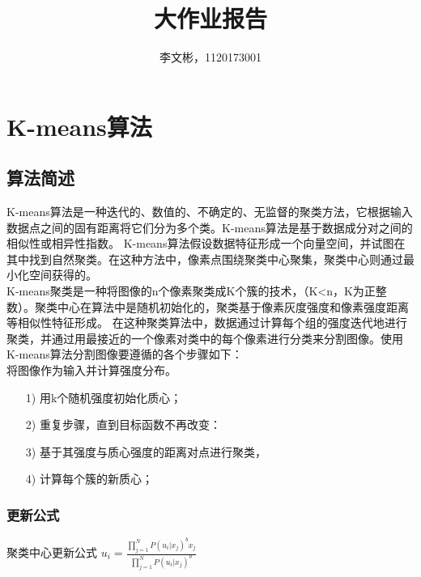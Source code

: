 \documentclass{article}
\title{大作业报告}
\author{李文彬，1120173001}
\begin{document}
	


\section{K-means算法}
\subsection{算法简述}
K-means算法是一种迭代的、数值的、不确定的、无监督的聚类方法，它根据输入数据点之间的固有距离将它们分为多个类。K-means算法是基于数据成分对之间的相似性或相异性指数。
K-means算法假设数据特征形成一个向量空间，并试图在其中找到自然聚类。在这种方法中，像素点围绕聚类中心聚集，聚类中心则通过最小化空间获得的。\\K-means聚类是一种将图像的n个像素聚类成K个簇的技术，（K<n，K为正整数）。聚类中心在算法中是随机初始化的，聚类基于像素灰度强度和像素强度距离等相似性特征形成。
在这种聚类算法中，数据通过计算每个组的强度迭代地进行聚类，并通过用最接近的一个像素对类中的每个像素进行分类来分割图像。使用K-means算法分割图像要遵循的各个步骤如下：
\\将图像作为输入并计算强度分布。
\begin{itemize}
\item[1)]用k个随机强度初始化质心；
\item[2)]重复步骤，直到目标函数不再改变：
\item[3)]基于其强度与质心强度的距离对点进行聚类，
\item[4)]计算每个簇的新质心；
\end{itemize}
\subsubsection{更新公式}

聚类中心更新公式
$u_{i}=\frac{\prod_{j=1}^{N}P\left ( u_{i}|x_{j}\right )^{b}x_{j}}{\prod_{j=1}^{N}P\left ( u_{i}|x_{j}\right )^{b}}$ 
\end{document}
